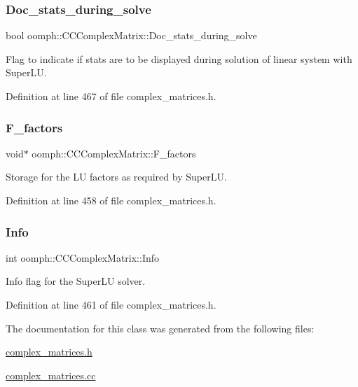 \subsubsection{\texorpdfstring{Doc\+\_\+stats\+\_\+during\+\_\+solve}{Doc\_stats\_during\_solve}}
{\footnotesize\ttfamily bool oomph\+::\+C\+C\+Complex\+Matrix\+::\+Doc\+\_\+stats\+\_\+during\+\_\+solve\hspace{0.3cm}{\ttfamily [protected]}}



Flag to indicate if stats are to be displayed during solution of linear system with Super\+LU. 



Definition at line 467 of file complex\+\_\+matrices.\+h.

\mbox{\label{classoomph_1_1CCComplexMatrix_ac97a80e97db7930912a519ba06ef2e98}} 
\subsubsection{\texorpdfstring{F\+\_\+factors}{F\_factors}}
{\footnotesize\ttfamily void$\ast$ oomph\+::\+C\+C\+Complex\+Matrix\+::\+F\+\_\+factors\hspace{0.3cm}{\ttfamily [private]}}



Storage for the LU factors as required by Super\+LU. 



Definition at line 458 of file complex\+\_\+matrices.\+h.

\mbox{\label{classoomph_1_1CCComplexMatrix_a2f306917c87df84224f9f78e96d3a100}} 
\subsubsection{\texorpdfstring{Info}{Info}}
{\footnotesize\ttfamily int oomph\+::\+C\+C\+Complex\+Matrix\+::\+Info\hspace{0.3cm}{\ttfamily [private]}}



Info flag for the Super\+LU solver. 



Definition at line 461 of file complex\+\_\+matrices.\+h.



The documentation for this class was generated from the following files\+:\begin{DoxyCompactItemize}
\item 
\hyperlink{complex__matrices_8h}{complex\+\_\+matrices.\+h}\item 
\hyperlink{complex__matrices_8cc}{complex\+\_\+matrices.\+cc}\end{DoxyCompactItemize}
